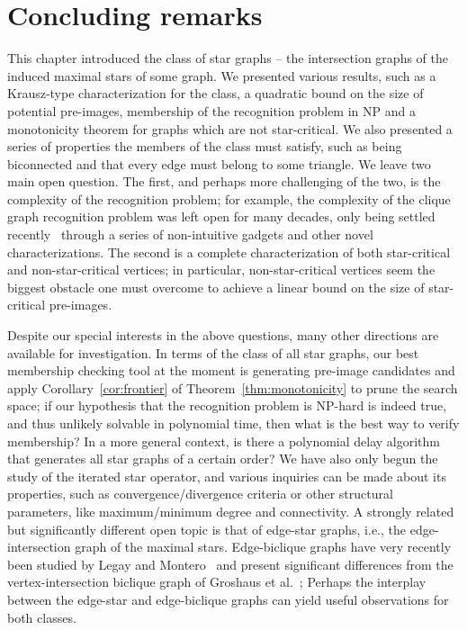 \section{Concluding remarks}

This chapter introduced the class of star graphs -- the intersection graphs of the induced maximal stars of some graph.
We presented various results, such as a Krausz-type characterization for the class, a quadratic bound on the size of potential pre-images, membership of the recognition problem in \textsf{NP} and a monotonicity theorem for graphs which are not star-critical.
We also presented a series of properties the members of the class must satisfy, such as being biconnected and that every edge must belong to some triangle.
We leave two main open question.
The first, and perhaps more challenging of the two, is the complexity of the recognition problem; for example, the complexity of the clique graph recognition problem was left open for many decades, only being settled recently~\cite{clique_recognition} through a series of non-intuitive gadgets and other novel characterizations.
The second is a complete characterization of both star-critical and non-star-critical vertices; in particular, non-star-critical vertices seem the biggest obstacle one must overcome to achieve a linear bound on the size of star-critical pre-images.

Despite our special interests in the above questions, many other directions are available for investigation.
In terms of the class of all star graphs, our best membership checking tool at the moment is generating pre-image candidates and apply Corollary~\ref{cor:frontier} of Theorem~\ref{thm:monotonicity} to prune the search space; if our hypothesis that the recognition problem is \textsf{NP-hard} is indeed true, and thus unlikely solvable in polynomial time, then what is the best way to verify membership?
In a more general context, is there a polynomial delay algorithm that generates all star graphs of a certain order?
We have also only begun the study of the iterated star operator, and various inquiries can be made about its properties, such as convergence/divergence criteria or other structural parameters, like maximum/minimum degree and connectivity.
A strongly related but significantly different open topic is that of edge-star graphs, i.e., the edge-intersection graph of the maximal stars.
Edge-biclique graphs have very recently been studied by Legay and Montero~\cite{edge_biclique} and present significant differences from the vertex-intersection biclique graph of Groshaus et al.~\cite{biclique_graph};
Perhaps the interplay between the edge-star and edge-biclique graphs can yield useful observations for both classes.